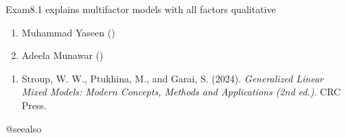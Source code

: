 \documentclass[a4paper]{book}
\begin{document}
%
\begin{Description}
Exam8.1 explains multifactor models with all factors qualitative
\end{Description}
%
\begin{Author}
\begin{enumerate}

\item{}  Muhammad Yaseen ()
\item{} Adeela Munawar ()

\end{enumerate}

\end{Author}
%
\begin{References}
\begin{enumerate}

\item{} Stroup, W. W., Ptukhina, M., and Garai, S. (2024).
\emph{Generalized Linear Mixed Models: Modern Concepts, Methods and Applications (2nd ed.)}.
CRC Press.

\end{enumerate}


@seealso
\end{References}
%
\end{document}
